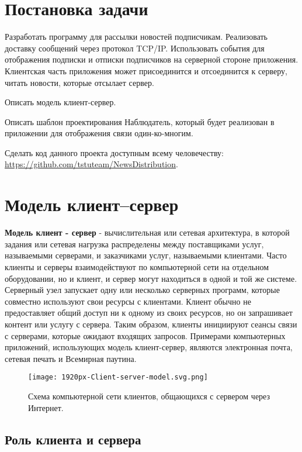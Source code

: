 
\section*{Постановка задачи}
Разработать программу для рассылки новостей подписчикам. 
Реализовать доставку сообщений через протокол TCP/IP. 
Использовать события для отображения подписки и отписки подписчиков на серверной стороне приложения.
Клиентская часть приложения может присоединится и отсоединится к серверу, читать новости, которые отсылает сервер.

Описать модель клиент-сервер.

Описать шаблон проектирования Наблюдатель, который будет реализован в приложении для отображения связи один-ко-многим.

Сделать код данного проекта доступным всему человечеству: \url{https://github.com/tstuteam/NewsDistribution}.

\newpage
\section{Модель клиент–сервер}

\textbf{Модель клиент - сервер} - вычислительная или сетевая архитектура, в которой задания или сетевая нагрузка распределены между поставщиками услуг, называемыми серверами, и заказчиками услуг, называемыми клиентами.
Часто клиенты и серверы взаимодействуют по компьютерной сети на отдельном оборудовании, но и клиент, и сервер могут находиться в одной и той же системе. 
Серверный узел запускает одну или несколько серверных программ, которые совместно используют свои ресурсы с клиентами.
Клиент обычно не предоставляет общий доступ ни к одному из своих ресурсов, но он запрашивает контент или услугу с сервера.
Таким образом, клиенты инициируют сеансы связи с серверами, которые ожидают входящих запросов.
Примерами компьютерных приложений, использующих модель клиент-сервер, являются электронная почта, сетевая печать и Всемирная паутина.

\begin{figure}[H]
	\begin{center}
		\texttt{[image: 1920px-Client-server-model.svg.png]}
		\caption{Схема компьютерной сети клиентов, общающихся с сервером через Интернет.}
	\end{center}
\end{figure}

\subsection{Роль клиента и сервера}

